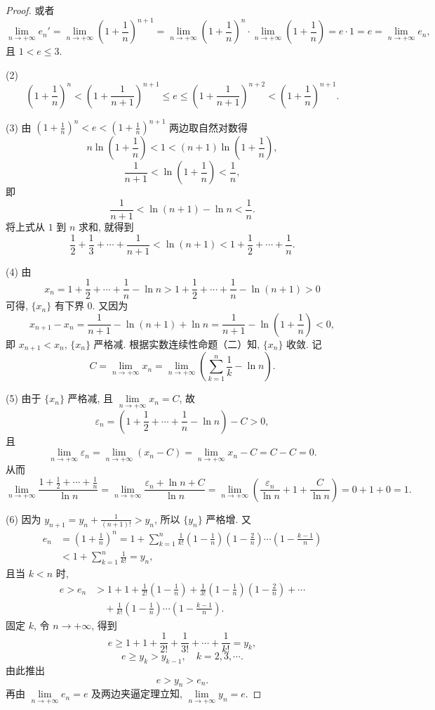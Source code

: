\begin{proof}
或者
\[
\lim_{n\to+\infty}e_{n}' = \lim_{n\to+\infty}\left(1 + \frac{1}{n}\right)^{n+1} = \lim_{n\to+\infty}\left(1 + \frac{1}{n}\right)^{n}\cdot\lim_{n\to+\infty}\left(1 + \frac{1}{n}\right) = e \cdot 1 = e = \lim_{n\to+\infty}e_{n},
\]
且 $1 < e \leqslant 3$.

(2) 
\[
\left(1 + \frac{1}{n}\right)^{n} < \left(1 + \frac{1}{n+1}\right)^{n+1} \leqslant e \leqslant \left(1 + \frac{1}{n+1}\right)^{n+2} < \left(1 + \frac{1}{n}\right)^{n+1}.
\]

(3) 由 $\left(1 + \frac{1}{n}\right)^{n} < e < \left(1 + \frac{1}{n}\right)^{n+1}$ 两边取自然对数得
\[
n\ln\left(1 + \frac{1}{n}\right) < 1 < (n+1)\ln\left(1 + \frac{1}{n}\right),
\]
\[
\frac{1}{n+1} < \ln\left(1 + \frac{1}{n}\right) < \frac{1}{n},
\]
即
\[
\frac{1}{n+1} < \ln(n+1) - \ln n < \frac{1}{n}.
\]
将上式从 $1$ 到 $n$ 求和, 就得到
\[
\frac{1}{2} + \frac{1}{3} + \cdots + \frac{1}{n+1} < \ln(n+1) < 1 + \frac{1}{2} + \cdots + \frac{1}{n}.
\]

(4) 由
\[
x_{n} = 1 + \frac{1}{2} + \cdots + \frac{1}{n} - \ln n > 1 + \frac{1}{2} + \cdots + \frac{1}{n} - \ln(n+1) > 0
\]
可得, $\{x_{n}\}$ 有下界 0. 又因为
\[
x_{n+1} - x_{n} = \frac{1}{n+1} - \ln(n+1) + \ln n = \frac{1}{n+1} - \ln\left(1 + \frac{1}{n}\right) < 0,
\]
即 $x_{n+1} < x_{n}$, $\{x_{n}\}$ 严格减. 根据实数连续性命题（二）知, $\{x_{n}\}$ 收敛. 记
\[
C = \lim_{n\to+\infty}x_n = \lim_{n\to+\infty}\left(\sum_{k=1}^{n}\frac{1}{k} - \ln n\right).
\]

(5) 由于 $\{x_{n}\}$ 严格减, 且 $\lim\limits_{n\to+\infty}x_{n} = C$, 故
\[
\varepsilon_{n} = \left(1 + \frac{1}{2} + \cdots + \frac{1}{n} - \ln n\right) - C > 0,
\]
且
\[
\lim_{n\to+\infty}\varepsilon_{n} = \lim_{n\to+\infty}(x_{n} - C) = \lim_{n\to+\infty}x_{n} - C = C - C = 0.
\]
从而
\[
\lim_{n\to+\infty}\frac{1 + \frac{1}{2} + \cdots + \frac{1}{n}}{\ln n} = \lim_{n\to+\infty}\frac{\varepsilon_{n} + \ln n + C}{\ln n} = \lim_{n\to+\infty}\left(\frac{\varepsilon_{n}}{\ln n} + 1 + \frac{C}{\ln n}\right) = 0 + 1 + 0 = 1.
\]

(6) 因为 $y_{n+1} = y_{n} + \frac{1}{(n+1)!} > y_{n}$, 所以 $\{y_{n}\}$ 严格增. 又
\[
\begin{aligned}
e_{n} &= \left(1 + \frac{1}{n}\right)^{n} = 1 + \sum_{k=1}^{n}\frac{1}{k!}\left(1 - \frac{1}{n}\right)\left(1 - \frac{2}{n}\right)\cdots\left(1 - \frac{k-1}{n}\right) \\
&< 1 + \sum_{k=1}^{n}\frac{1}{k!} = y_{n},
\end{aligned}
\]
且当 $k < n$ 时,
\[
\begin{aligned}
e > e_{n} &> 1 + 1 + \frac{1}{2!}\left(1 - \frac{1}{n}\right) + \frac{1}{3!}\left(1 - \frac{1}{n}\right)\left(1 - \frac{2}{n}\right) + \cdots \\
&\quad + \frac{1}{k!}\left(1 - \frac{1}{n}\right)\cdots\left(1 - \frac{k-1}{n}\right).
\end{aligned}
\]
固定 $k$, 令 $n \to +\infty$, 得到
\[
e \geqslant 1 + 1 + \frac{1}{2!} + \frac{1}{3!} + \cdots + \frac{1}{k!} = y_{k},
\]
\[
e \geqslant y_{k} > y_{k-1},\quad k=2,3,\cdots.
\]
由此推出
\[
e > y_{n} > e_{n}.
\]
再由 $\lim\limits_{n\to+\infty}e_n = e$ 及两边夹逼定理立知, $\lim\limits_{n\to+\infty}y_n = e$.


\end{proof}
